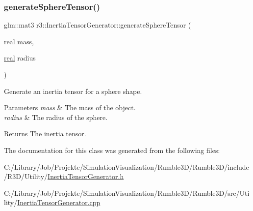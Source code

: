 \subsubsection{\texorpdfstring{generate\+Sphere\+Tensor()}{generateSphereTensor()}}
{\footnotesize\ttfamily glm\+::mat3 r3\+::\+Inertia\+Tensor\+Generator\+::generate\+Sphere\+Tensor (\begin{DoxyParamCaption}\item[{\mbox{\hyperlink{namespacer3_ab2016b3e3f743fb735afce242f0dc1eb}{real}}}]{mass,  }\item[{\mbox{\hyperlink{namespacer3_ab2016b3e3f743fb735afce242f0dc1eb}{real}}}]{radius }\end{DoxyParamCaption})\hspace{0.3cm}{\ttfamily [static]}}



Generate an inertia tensor for a sphere shape. 


\begin{DoxyParams}{Parameters}
{\em mass} & The mass of the object. \\
\hline
{\em radius} & The radius of the sphere. \\
\hline
\end{DoxyParams}
\begin{DoxyReturn}{Returns}
The inertia tensor. 
\end{DoxyReturn}


The documentation for this class was generated from the following files\+:\begin{DoxyCompactItemize}
\item 
C\+:/\+Library/\+Job/\+Projekte/\+Simulation\+Visualization/\+Rumble3\+D/\+Rumble3\+D/include/\+R3\+D/\+Utility/\mbox{\hyperlink{_inertia_tensor_generator_8h}{Inertia\+Tensor\+Generator.\+h}}\item 
C\+:/\+Library/\+Job/\+Projekte/\+Simulation\+Visualization/\+Rumble3\+D/\+Rumble3\+D/src/\+Utility/\mbox{\hyperlink{_inertia_tensor_generator_8cpp}{Inertia\+Tensor\+Generator.\+cpp}}\end{DoxyCompactItemize}
